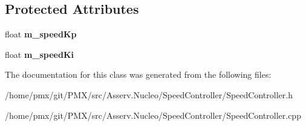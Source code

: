 \subsection*{Protected Attributes}
\begin{DoxyCompactItemize}
\item 
\mbox{\label{classSpeedController_ad82c78a8733842ae2248066e0f1cfe8f}} 
float {\bfseries m\+\_\+speed\+Kp}
\item 
\mbox{\label{classSpeedController_af7c52e47d1bd23ef3a8297575349ff04}} 
float {\bfseries m\+\_\+speed\+Ki}
\end{DoxyCompactItemize}


The documentation for this class was generated from the following files\+:\begin{DoxyCompactItemize}
\item 
/home/pmx/git/\+P\+M\+X/src/\+Asserv.\+Nucleo/\+Speed\+Controller/Speed\+Controller.\+h\item 
/home/pmx/git/\+P\+M\+X/src/\+Asserv.\+Nucleo/\+Speed\+Controller/Speed\+Controller.\+cpp\end{DoxyCompactItemize}
